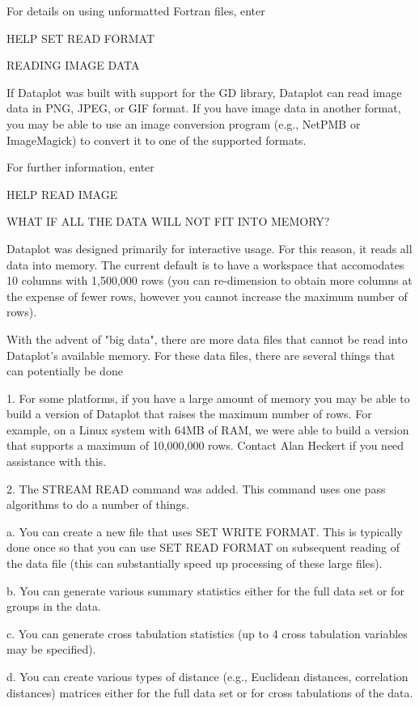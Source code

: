 For details on using unformatted Fortran files, enter

     HELP SET READ FORMAT


READING IMAGE DATA

If Dataplot was built with support for the GD library, Dataplot
can read image data in PNG, JPEG, or GIF format.  If you have
image data in another format, you may be able to use an image
conversion program (e.g., NetPMB or ImageMagick) to convert it
to one of the supported formats.

For further information, enter

    HELP READ IMAGE


WHAT IF ALL THE DATA WILL NOT FIT INTO MEMORY?

Dataplot was designed primarily for interactive usage.  For this reason,
it reads all data into memory.  The current default is to have a
workspace that accomodates 10 columns with 1,500,000 rows (you can
re-dimension to obtain more columns at the expense of fewer rows, however
you cannot increase the maximum number of rows).

With the advent of "big data", there are more data files that cannot be
read into Dataplot's available memory.  For these data files, there are
several things that can potentially be done

   1. For some platforms, if you have a large amount of memory you may
      be able to build a version of Dataplot that raises the maximum
      number of rows.  For example, on a Linux system with 64MB of RAM,
      we were able to build a version that supports a maximum of
      10,000,000 rows.  Contact Alan Heckert if you need assistance
      with this.

   2. The STREAM READ command was added.  This command uses one pass
      algorithms to do a number of things.

      a. You can create a new file that uses SET WRITE FORMAT.  This
         is typically done once so that you can use SET READ FORMAT on
         subsequent reading of the data file (this can substantially
         speed up processing of these large files).

      b. You can generate various summary statistics either for the full
         data set or for groups in the data.

      c. You can generate cross tabulation statistics (up to 4
         cross tabulation variables may be specified).

      d. You can create various types of distance (e.g., Euclidean
         distances, correlation distances) matrices either for the full
         data set or for cross tabulations of the data.
 
